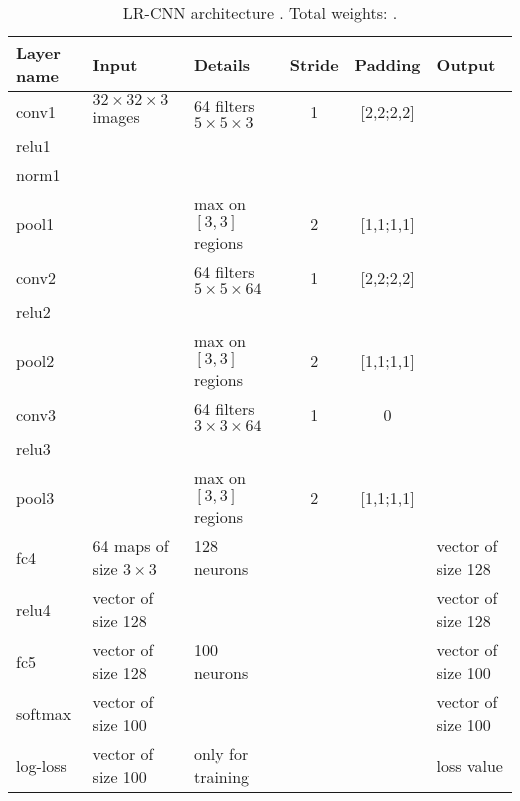 \begin{table}[h]
\begin{center}
 \begin{tabular}{|l||l||l|c|c||l|}
   \hline
   Layer name & Input                          & Details                                 & Stride & Padding   & Output                 \\
   \hline
   \hline
   conv1      & $32 \times 32 \times 3$ images & 64 filters $5 \times 5 \times 3$        & 1      & [2,2;2,2] &  \\
   relu1      &                                &                                         &        &           &  \\
   norm1      &                                &                                         &        &           &  \\
   pool1      &                                & max on $[3,3]$ regions                  & 2      & [1,1;1,1] &  \\
   \hline
   conv2      &                                & 64 filters $5 \times 5 \times 64$       & 1      & [2,2;2,2] &  \\
   relu2      &                                &                                         &        &           &  \\
   pool2      &                                & max on $[3,3]$ regions                  & 2      & [1,1;1,1] &  \\
   \hline
   conv3      &                                & 64 filters $3 \times 3 \times 64$       & 1      & 0         &  \\
   relu3      &                                &                                         &        &           &  \\
   pool3      &                                & max on $[3,3]$ regions                  & 2      & [1,1;1,1] &  \\
   \hline
   fc4        & 64 maps of size $3 \times 3$   & 128 neurons                             &        &           & vector of size 128 \\
   relu4      & vector of size 128             &                                         &        &           & vector of size 128 \\
   \hline
   fc5        & vector of size 128             & 100 neurons                             &        &           & vector of size 100 \\
   softmax    & vector of size 100             &                                         &        &           & vector of size 100 \\
   log-loss   & vector of size 100             & only for training                       &        &           & loss value         \\
 \end{tabular}
 \caption{LR-CNN architecture \cite{Chevalier15}. Total weights: .}
 \label{table:LR-CNN}
\end{center}
\end{table} 







